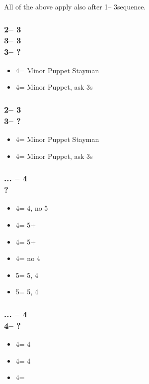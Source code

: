 \documentclass[12pt, a4paper]{report}
\begin{document}
{{        All of the above apply also after 1\nt -- 3\clubs sequence.

        \subsubsection*{2\nt -- 3\diams\\
                        3\hearts -- 3\spades\\
                        3\nt -- ?}
        \begin{itemize}
            \item 4\clubs = Minor Puppet Stayman
            \item 4\diams = Minor Puppet, ask 3s
        \end{itemize}

        \subsubsection*{2\nt -- 3\hearts\\
                        3\spades -- ?}
        \begin{itemize}
            \item 4\clubs = Minor Puppet Stayman
            \item 4\diams = Minor Puppet, ask 3s
        \end{itemize}

        \subsubsection*{... -- 4\clubs\\
                        ?}
        \begin{itemize}
            \item 4\diams = 4\minor, no 5\minor
            \item 4\hearts = 5+\clubs
            \item 4\spades = 5+\diams
            \item 4\nt = no 4\minor
            \item 5\clubs = 5\clubs, 4\diams
            \item 5\diams = 5\diams, 4\clubs
        \end{itemize}

        \subsubsection*{... -- 4\clubs\\
                        4\diams -- ?}
        \begin{itemize}
            \item 4\hearts = 4\clubs
            \item 4\spades = 4\diams
            \item 4\nt = \soff
        \end{itemize}

}}
\end{document}

